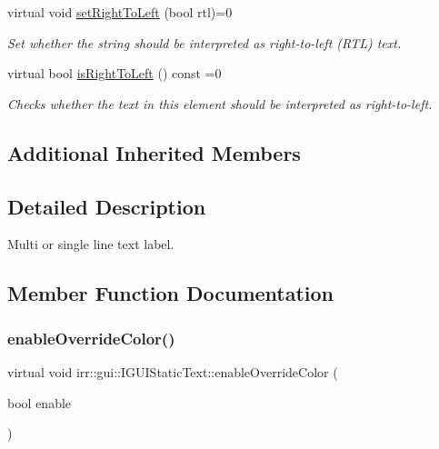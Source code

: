 \begin{DoxyCompactItemize}
virtual void \hyperlink{classirr_1_1gui_1_1IGUIStaticText_a43cee247cf34faa30851f4e8c10b2367}{set\+Right\+To\+Left} (bool rtl)=0
\begin{DoxyCompactList}\small\item\em Set whether the string should be interpreted as right-\/to-\/left (R\+TL) text. \end{DoxyCompactList}\item 
\mbox{\label{classirr_1_1gui_1_1IGUIStaticText_a750a43d48f16d0e89aa28a0175a06ff6}} 
virtual bool \hyperlink{classirr_1_1gui_1_1IGUIStaticText_a750a43d48f16d0e89aa28a0175a06ff6}{is\+Right\+To\+Left} () const =0
\begin{DoxyCompactList}\small\item\em Checks whether the text in this element should be interpreted as right-\/to-\/left. \end{DoxyCompactList}\end{DoxyCompactItemize}
\subsection*{Additional Inherited Members}


\subsection{Detailed Description}
Multi or single line text label. 

\subsection{Member Function Documentation}
\mbox{\label{classirr_1_1gui_1_1IGUIStaticText_ae1f432263d4c638b0441f8b993f301bc}} 
\subsubsection{\texorpdfstring{enable\+Override\+Color()}{enableOverrideColor()}}
{\footnotesize\ttfamily virtual void irr\+::gui\+::\+I\+G\+U\+I\+Static\+Text\+::enable\+Override\+Color (\begin{DoxyParamCaption}\item[{bool}]{enable }\end{DoxyParamCaption})\hspace{0.3cm}{\ttfamily [pure virtual]}}



